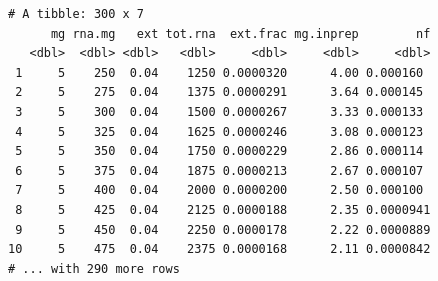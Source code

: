 \documentclass[twoside,10pt]{gihclass} %
\newenvironment{Shaded}{\begin{snugshade}}{\end{snugshade}}
\newcommand{\DataTypeTok}[1]{\textcolor[rgb]{0.13,0.29,0.53}{#1}}
\newcommand{\DecValTok}[1]{\textcolor[rgb]{0.00,0.00,0.81}{#1}}
\newcommand{\FloatTok}[1]{\textcolor[rgb]{0.00,0.00,0.81}{#1}}
\newcommand{\KeywordTok}[1]{\textcolor[rgb]{0.13,0.29,0.53}{\textbf{#1}}}
\newcommand{\NormalTok}[1]{#1}
\newcommand{\OperatorTok}[1]{\textcolor[rgb]{0.81,0.36,0.00}{\textbf{#1}}}
\newcommand{\StringTok}[1]{\textcolor[rgb]{0.31,0.60,0.02}{#1}}
\begin{document}
\begin{verbatim}
# A tibble: 300 x 7
      mg rna.mg   ext tot.rna  ext.frac mg.inprep        nf
   <dbl>  <dbl> <dbl>   <dbl>     <dbl>     <dbl>     <dbl>
 1     5    250  0.04    1250 0.0000320      4.00 0.000160 
 2     5    275  0.04    1375 0.0000291      3.64 0.000145 
 3     5    300  0.04    1500 0.0000267      3.33 0.000133 
 4     5    325  0.04    1625 0.0000246      3.08 0.000123 
 5     5    350  0.04    1750 0.0000229      2.86 0.000114 
 6     5    375  0.04    1875 0.0000213      2.67 0.000107 
 7     5    400  0.04    2000 0.0000200      2.50 0.000100 
 8     5    425  0.04    2125 0.0000188      2.35 0.0000941
 9     5    450  0.04    2250 0.0000178      2.22 0.0000889
10     5    475  0.04    2375 0.0000168      2.11 0.0000842
# ... with 290 more rows
\end{verbatim}
\begin{Shaded}
\end{Shaded}
\end{document}
